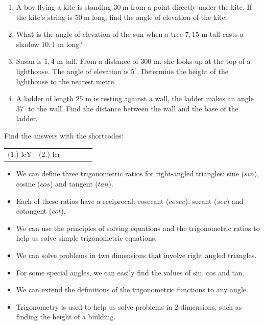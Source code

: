 \begin{exercises}{}
{
\begin{enumerate}[noitemsep, label=\textbf{\arabic*}. ] 

\item A boy flying a kite is standing $30~$m from a point directly under the kite. If the kite's string is $50~$m long, find the angle of elevation of the kite.
\item What is the angle of elevation of the sun when a tree $7,15$ m tall casts a shadow $10,1$ m long?
\item Susan is $1,4$ m tall. From a distance of $300$ m, she looks up at the top of a lighthouse. The angle of elevation is $5^{\circ}$. Determine the height of the lighthouse to the nearest metre.
\item A ladder of length $25$ m is resting against a wall, the ladder makes an angle $37^{\circ}$ to the wall. Find the distance between the wall and the base of the ladder. 

\end{enumerate}

\par {} Find the answers with the shortcodes:
\par \begin{tabular}[h]{cccccc}
(1.) lcY  &  (2.) lcr  & \end{tabular}
    
}
\end{exercises} 


\summary
\begin{itemize}[noitemsep]
\item We can define three trigonometric ratios for right-angled triangles: sine ($sin$), cosine ($cos$) and tangent ($tan$).
\item Each of these ratios have a reciprocal: cosecant ($cosec$), secant ($sec$) and cotangent ($cot$).
\item We can use the principles of solving equations and the trigonometric ratios to help us solve simple trigonometric equations.
\item We can solve problems in two dimensions that involve right angled triangles.
\item For some special angles, we can easily find the values of sin, cos and tan.
\item We can extend the definitions of the trigonometric functions to any angle.
\item Trigonometry is used to help us solve problems in 2-dimensions, such as finding the height of a building.
\end{itemize}


